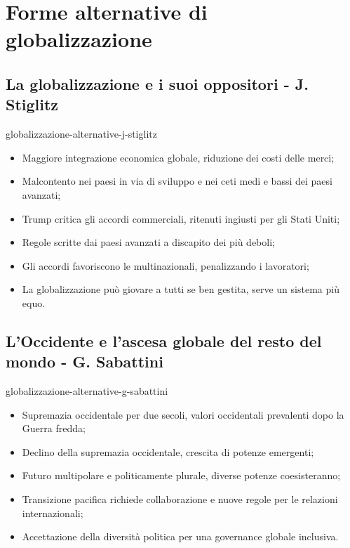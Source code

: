 \documentclass[preview]{standalone}
\begin{document}
\genpage


\section{Forme alternative di globalizzazione}

\subsection{La globalizzazione e i suoi oppositori - J. Stiglitz}

\begin{snippet}{globalizzazione-alternative-j-stiglitz}
    \vspace{-0.25cm}
    \begin{itemize}
        \item Maggiore integrazione economica globale, riduzione dei costi delle merci;
        \item Malcontento nei paesi in via di sviluppo e nei ceti medi e bassi dei paesi avanzati;
        \item Trump critica gli accordi commerciali, ritenuti ingiusti per gli Stati Uniti;
        \item Regole scritte dai paesi avanzati a discapito dei più deboli;
        \item Gli accordi favoriscono le multinazionali, penalizzando i lavoratori;
        \item La globalizzazione può giovare a tutti se ben gestita, serve un sistema più equo.
    \end{itemize}
\end{snippet}

\subsection{L'Occidente e l'ascesa globale del resto del mondo - G. Sabattini}

\begin{snippet}{globalizzazione-alternative-g-sabattini}
    \vspace{-0.25cm}
    \begin{itemize}
        \item Supremazia occidentale per due secoli, valori occidentali prevalenti dopo la Guerra
            fredda;
        \item Declino della supremazia occidentale, crescita di potenze emergenti;
        \item Futuro multipolare e politicamente plurale, diverse potenze coesisteranno;
        \item Transizione pacifica richiede collaborazione e nuove regole per le relazioni
            internazionali;
        \item Accettazione della diversità politica per una governance globale inclusiva.
    \end{itemize}
\end{snippet}
\end{document}

